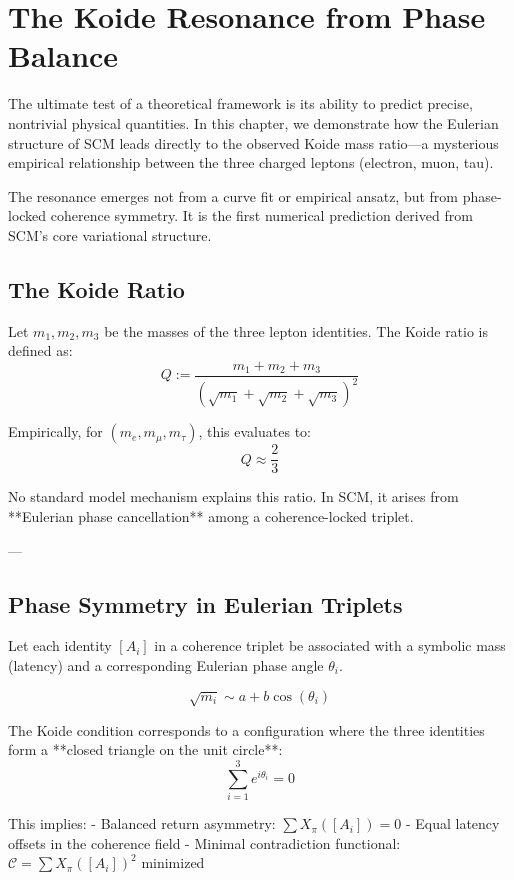 \chapter{The Koide Resonance from Phase Balance} \label{chapter:koide}

The ultimate test of a theoretical framework is its ability to predict precise, nontrivial physical quantities. In this chapter, we demonstrate how the Eulerian structure of SCM leads directly to the observed Koide mass ratio—a mysterious empirical relationship between the three charged leptons (electron, muon, tau).

The resonance emerges not from a curve fit or empirical ansatz, but from phase-locked coherence symmetry. It is the first numerical prediction derived from SCM's core variational structure.

\section{The Koide Ratio}

Let $m_1, m_2, m_3$ be the masses of the three lepton identities. The Koide ratio is defined as:
\[
Q := \frac{m_1 + m_2 + m_3}{\left( \sqrt{m_1} + \sqrt{m_2} + \sqrt{m_3} \right)^2}
\]

Empirically, for $(m_e, m_\mu, m_\tau)$, this evaluates to:
\[
Q \approx \frac{2}{3}
\]

No standard model mechanism explains this ratio. In SCM, it arises from **Eulerian phase cancellation** among a coherence-locked triplet.

---

\section{Phase Symmetry in Eulerian Triplets}

Let each identity $[A_i]$ in a coherence triplet be associated with a symbolic mass (latency) and a corresponding Eulerian phase angle $\theta_i$.

\[
\sqrt{m_i} \sim a + b \cos(\theta_i)
\]

The Koide condition corresponds to a configuration where the three identities form a **closed triangle on the unit circle**:
\[
\sum_{i=1}^{3} e^{i\theta_i} = 0
\]

This implies:
- Balanced return asymmetry: $\sum X_\pi([A_i]) = 0$
- Equal latency offsets in the coherence field
- Minimal contradiction functional: $\mathcal{C} = \sum X_\pi([A_i])^2$ minimized

